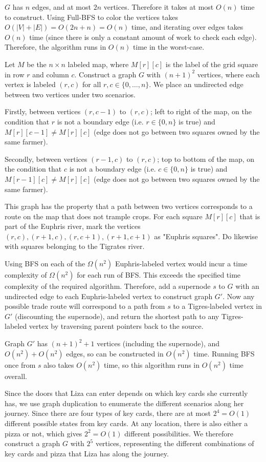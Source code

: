 \documentclass[12pt,twoside]{article}
\begin{document}
\begin{problems}
$G$ has $n$ edges, and at most $2n$ vertices. Therefore it takes at most $O(n)$ time to construct. Using Full-BFS to color the vertices takes $O(|V|+|E|)=O(2n+n)=O(n)$ time, and iterating over edges takes $O(n)$ time (since there is only a constant amount of work to check each edge). Therefore, the algorithm runs in $O(n)$ time in the worst-case.

\newpage
\problem  %
Let $M$ be the $n \times n$ labeled map, where $M[r][c]$ is the label of the grid square in row $r$ and column $c$. Construct a graph $G$ with $(n+1)^2$ vertices, where each vertex is labeled $(r,c)$ for all $r, c \in \{0, \ldots,n\}$. We place an undirected edge between two vertices under two scenarios.

Firstly, between vertices $(r, c-1)$ to $(r, c)$; left to right of the map, on the condition that $r$ is not a boundary edge (i.e. $r \in \{0,n\}$ is true) and $M[r][c-1]\neq M[r][c]$ (edge does not go between two squares owned by the same farmer).

Secondly, between vertices $(r-1,c)$ to $(r,c)$; top to bottom of the map, on the condition that $c$ is not a boundary edge (i.e. $c \in \{0,n\}$ is true) and $M[r-1][c] \neq M[r][c]$ (edge does not go between two squares owned by the same farmer).

This graph has the property that a path between two vertices corresponds to a route on the map that does not trample crops. For each square $M[r][c]$ that is part of the Euphris river, mark the vertices $(r,c),(r+1,c),(r,c+1),(r+1,c+1)$ as "Euphris squares". Do likewise with squares belonging to the Tigrates river.

Using BFS on each of the $\Omega(n^2)$ Euphris-labeled vertex would incur a time complexity of $\Omega(n^2)$ for each run of BFS. This exceeds the specified time complexity of the required algorithm. Therefore, add a supernode $s$ to $G$ with an undirected edge to each Euphris-labeled vertex to construct graph $G'$. Now any possible trade route will correspond to a path from $s$ to a Tigres-labeled vertex in $G'$ (discounting the supernode), and return the shortest path to any Tigres-labeled vertex by traversing parent pointers back to the source.

Graph $G'$ has $(n+1)^2+1$ vertices (including the supernode), and $O(n^2)+O(n^2)$ edges, so can be constructed in $O(n^2)$ time. Running BFS once from $s$ also takes $O(n^2)$ time, so this algorithm runs in $O(n^2)$ time overall.

\newpage
\problem  %
Since the doors that Liza can enter depends on which key cards she currently has, we use graph duplication to enumerate the different scenarios along her journey. Since there are four types of key cards, there are at most $2^4=O(1)$ different possible states from key cards. At any location, there is also either a pizza or not, which gives $2^2=O(1)$ different possibilities. We therefore construct a graph $G$ with $2^5$ vertices, representing the different combinations of key cards and pizza that Liza has along the journey.


\end{problems}
\end{document}
